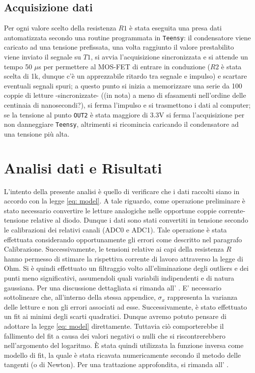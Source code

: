 \documentclass{article}[a4paper, oneside, 11pt]
\begin{document}
\subsection{Acquisizione dati}
Per ogni valore scelto della resistenza $R1$ è stata eseguita una presa dati 
automatizzata secondo una routine programmata in \verb+Teensy+: il condensatore 
viene caricato ad una tensione prefissata, una volta raggiunto il valore 
prestabilito viene inviato il segnale su $T1$, si avvia l'acquisizione 
sincronizzata e si attende un tempo 50 $\mu$s per permettere al MOS-FET di 
entrare in conduzione ($R2$ è stata scelta di 1k, dunque c'è un apprezzabile 
ritardo tra segnale e impulso) e scartare eventuali segnali spuri; a questo 
punto si inizia a memorizzare una serie da 100 coppie di letture 
-sincronizzate- ((in nota) a meno di sfasamenti nell'ordine delle centinaia di 
nanosecondi?), si ferma l'impulso e si trasmettono i dati al computer; se la 
tensione al punto \verb+OUT2+ è stata maggiore di 3.3V si ferma l'acquisizione
per non danneggiare \verb+Teensy+, altrimenti si ricomincia caricando il
condensatore ad una tensione più alta.

\section{Analisi dati e Risultati}
L’intento della presente analisi è quello di verificare che i dati raccolti siano in accordo con la legge \eqref{eq: model}. A tale riguardo, come operazione preliminare è stato necessario convertire le letture analogiche nelle opportune coppie corrente-tensione relative al diodo. Dunque i dati sono stati convertiti in tensione secondo le calibrazioni dei relativi canali (ADC0 e ADC1). Tale operazione è stata effettuata considerando opportunamente gli errori come descritto nel paragrafo Calibrazione. Successivamente, le tensioni relative ai capi della resistenza $R$ hanno permesso di stimare la rispettiva corrente di lavoro attraverso la legge di Ohm. 
Si è quindi effettuato un filtraggio volto all'eliminazione degli outliers e dei punti meno significativi, assumendoli quali variabili indipendenti e di natura gaussiana. Per una discussione dettagliata si rimanda all' . E’ necessario sottolineare che, all’interno della stessa appendice, $\sigma_x$ rappresenta la varianza delle letture e non gli errori associati ad esse.
Successivamente, è stato effettuato un fit ai minimi degli scarti quadratici. Dunque avremo potuto pensare di adottare la legge \eqref{eq: model} direttamente. Tuttavia ciò comporterebbe il fallimento del fit a causa dei valori negativi o nulli che si riscontrerebbero nell’argomento del logaritmo. \`E stata quindi utilizzata la funzione inversa come modello di fit, la quale è stata ricavata numericamente secondo il metodo delle tangenti (o di Newton). Per una trattazione approfondita, si rimanda all' .
\end{document}
